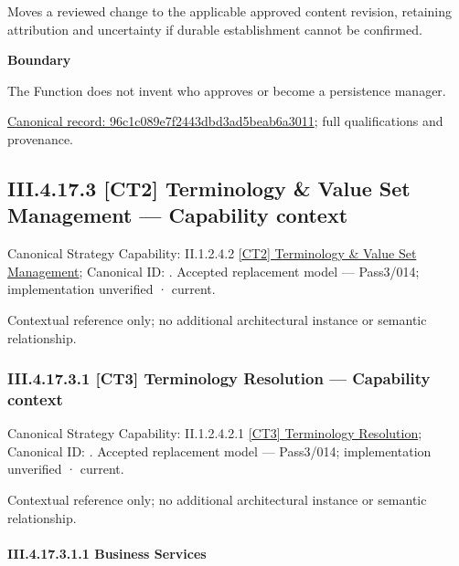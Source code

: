 Moves a reviewed change to the applicable approved content revision, retaining attribution and uncertainty if durable establishment cannot be confirmed.



\textbf{Boundary}



The Function does not invent who approves or become a persistence manager.


{\footnotesize \href{../../../../../../../../continuum/business/business-function/96c1c089e7f2443dbd3ad5beab6a3011.md}{Canonical record: 96c1c089e7f2443dbd3ad5beab6a3011}; full qualifications and provenance.}\par
\subsection*{III.4.17.3 [CT2] Terminology \& Value Set Management — Capability context}
\label{navigation:III.4.17.3}

{\small Canonical Strategy Capability: II.1.2.4.2 \hyperref[element:206b3d64a5b14e9a99974851c8be45df]{[CT2] Terminology \& Value Set Management}; Canonical ID: \texttt{}. Accepted replacement model — Pass3/014; implementation unverified · current.}\par
Contextual reference only; no additional architectural instance or semantic relationship.\par
\subsubsection*{III.4.17.3.1 [CT3] Terminology Resolution — Capability context}
\label{navigation:III.4.17.3.1}

{\small Canonical Strategy Capability: II.1.2.4.2.1 \hyperref[element:aaca8daf33a242b19a748be71003fb2c]{[CT3] Terminology Resolution}; Canonical ID: \texttt{}. Accepted replacement model — Pass3/014; implementation unverified · current.}\par
Contextual reference only; no additional architectural instance or semantic relationship.\par
\paragraph*{III.4.17.3.1.1 Business Services}
\label{navigation:III.4.17.3.1.1}

